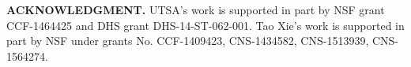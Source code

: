 \documentclass[sigconf]{acmart}
\begin{document}
\maketitle









\vspace{+0.2cm}
\noindent\textbf{ACKNOWLEDGMENT.}
UTSA's work is supported in part by NSF grant CCF-1464425 and DHS grant DHS-14-ST-062-001. Tao Xie's work is supported in part by NSF under grants No. CCF-1409423, CNS-1434582, CNS-1513939, CNS-1564274.
\balance

 
%
\end{document}
